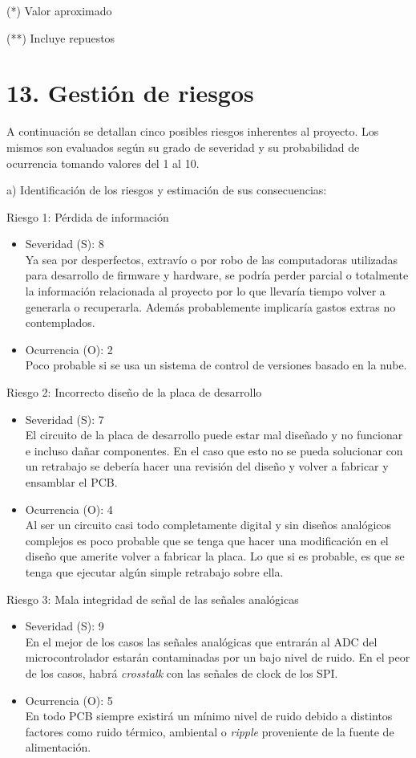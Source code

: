\documentclass[
11pt, %
codirector, %
]{charter}
\begin{document}
(*) Valor aproximado

(**) Incluye repuestos

\section{13. Gestión de riesgos}
\label{sec:riesgos}

A continuación se detallan cinco posibles riesgos inherentes al proyecto. Los mismos son
evaluados según su grado de severidad y su probabilidad de ocurrencia tomando valores del
1 al 10.

a) Identificación de los riesgos y estimación de sus consecuencias:

Riesgo 1: Pérdida de información
\begin{itemize}
	\item Severidad (S): 8 \\
	Ya sea por desperfectos, extravío o por robo de las computadoras utilizadas para desarrollo de firmware y hardware, se podría perder parcial o totalmente la información relacionada al proyecto por lo que llevaría tiempo volver a generarla o recuperarla. Además probablemente implicaría gastos extras no contemplados.
	\item Ocurrencia (O): 2 \\
	Poco probable si se usa un sistema de control de versiones basado en la nube.
\end{itemize}

Riesgo 2: Incorrecto diseño de la placa de desarrollo
\begin{itemize}
	\item Severidad (S): 7 \\
	El circuito de la placa de desarrollo puede estar mal diseñado y no funcionar e incluso dañar componentes. En el caso que esto no se pueda solucionar con un retrabajo se debería hacer una revisión del diseño y volver a fabricar y ensamblar el PCB.
	\item Ocurrencia (O): 4 \\
	Al ser un circuito casi todo completamente digital y sin diseños analógicos complejos es poco probable que se tenga que hacer una modificación en el diseño que amerite volver a fabricar la placa. Lo que si es probable, es que se tenga que ejecutar algún simple retrabajo sobre ella.
\end{itemize}

Riesgo 3: Mala integridad de señal de las señales analógicas
\begin{itemize}
	\item Severidad (S): 9 \\
	En el mejor de los casos las señales analógicas que entrarán al ADC del microcontrolador estarán contaminadas por un bajo nivel de ruido. En el peor de los casos, habrá \textit{crosstalk} con las señales de clock de los SPI.
	\item Ocurrencia (O): 5 \\
	En todo PCB siempre existirá un mínimo nivel de ruido debido a distintos factores como ruido térmico, ambiental o \textit{ripple} proveniente de la fuente de alimentación.
\end{itemize}
\end{document}
